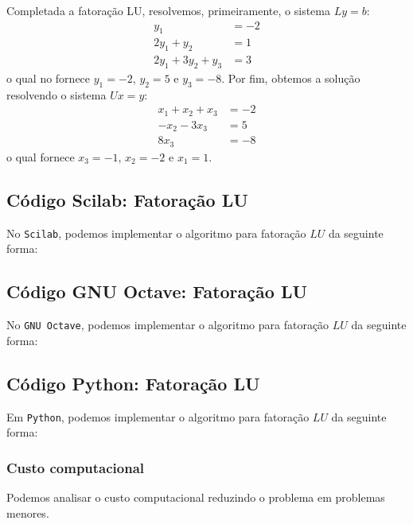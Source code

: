 \begin{sol}
Completada a fatoração LU, resolvemos, primeiramente, o sistema $Ly = b$:
\begin{equation*}
  \begin{split}
    y_1 &= -2\\
    2y_1 + y_2 &= 1\\
    2y_1 + 3y_2 + y_3 &= 3
  \end{split}
\end{equation*}
o qual no fornece $y_1 = -2$, $y_2 = 5$ e $y_3 = -8$. Por fim, obtemos a solução resolvendo o sistema $Ux = y$:
\begin{equation*}
  \begin{split}
  x_1 + x_2 + x_3 &= -2\\
  -x_2 - 3x_3 &= 5\\
  8x_3 &= -8    
  \end{split}
\end{equation*}
o qual fornece $x_3 = -1$, $x_2 = -2$ e $x_1 = 1$.
\end{sol}

\ifisscilab
\subsection{Código Scilab: Fatoração LU}
No \verb+Scilab+, podemos implementar o algoritmo para fatoração $LU$ da seguinte forma:
%

\fi
\ifisoctave
\subsection{Código GNU Octave: Fatoração LU}
No \verb+GNU Octave+, podemos implementar o algoritmo para fatoração $LU$ da seguinte forma:

\fi
\ifispython
\subsection{Código Python: Fatoração LU}
Em \verb+Python+, podemos implementar o algoritmo para fatoração $LU$ da seguinte forma:

\fi

\ifisscilab
\subsubsection{Custo computacional}
Podemos analisar o custo computacional reduzindo o problema em problemas menores. %

